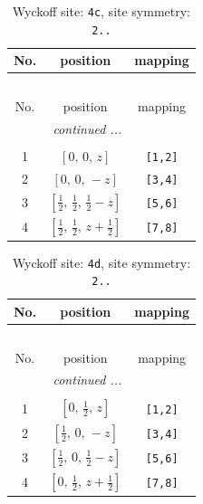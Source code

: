\documentclass[fleqn,8pt]{jsarticle}
\begin{document}
\renewcommand{\arraystretch}{1.2}
\begin{longtable}{ccc}
\caption{Wyckoff site: {\tt 4c}, site symmetry: {\tt 2..}}
 \\
 \hline \hline
No. & position & mapping \\ \hline \endfirsthead

\multicolumn{2}{l}{\tablename\ \thetable{}} \\
 \hline \hline
No. & position & mapping \\ \hline \endhead

 \hline \hline
\multicolumn{2}{r}{\footnotesize\it continued ...} \\ \endfoot

 \hline \hline
\multicolumn{2}{r}{} \\ \endlastfoot

1 & $\left[ 0,\, 0,\, z \right]$ & {\tt [1,2]} \\ \hline
2 & $\left[ 0,\, 0,\, - z \right]$ & {\tt [3,4]} \\ \hline
3 & $\left[ \frac{1}{2},\, \frac{1}{2},\, \frac{1}{2} - z \right]$ & {\tt [5,6]} \\ \hline
4 & $\left[ \frac{1}{2},\, \frac{1}{2},\, z + \frac{1}{2} \right]$ & {\tt [7,8]} \\
\end{longtable}
\renewcommand{\arraystretch}{1.2}
\begin{longtable}{ccc}
\caption{Wyckoff site: {\tt 4d}, site symmetry: {\tt 2..}}
 \\
 \hline \hline
No. & position & mapping \\ \hline \endfirsthead

\multicolumn{2}{l}{\tablename\ \thetable{}} \\
 \hline \hline
No. & position & mapping \\ \hline \endhead

 \hline \hline
\multicolumn{2}{r}{\footnotesize\it continued ...} \\ \endfoot

 \hline \hline
\multicolumn{2}{r}{} \\ \endlastfoot

1 & $\left[ 0,\, \frac{1}{2},\, z \right]$ & {\tt [1,2]} \\ \hline
2 & $\left[ \frac{1}{2},\, 0,\, - z \right]$ & {\tt [3,4]} \\ \hline
3 & $\left[ \frac{1}{2},\, 0,\, \frac{1}{2} - z \right]$ & {\tt [5,6]} \\ \hline
4 & $\left[ 0,\, \frac{1}{2},\, z + \frac{1}{2} \right]$ & {\tt [7,8]} \\
\end{longtable}
\end{document}
